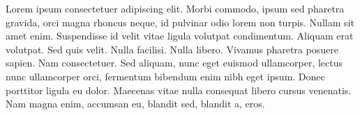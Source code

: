 
Lorem ipsum consectetuer adipiscing elit. Morbi commodo, ipsum sed pharetra gravida, orci magna rhoncus neque, id pulvinar odio lorem non turpis. Nullam sit amet enim. Suspendisse id velit vitae ligula volutpat condimentum. Aliquam erat volutpat. Sed quis velit. Nulla facilisi. Nulla libero. Vivamus pharetra posuere sapien. Nam consectetuer. Sed aliquam, nunc eget euismod ullamcorper, lectus nunc ullamcorper orci, fermentum bibendum enim nibh eget ipsum. Donec porttitor ligula eu dolor. Maecenas vitae nulla consequat libero cursus venenatis. Nam magna enim, accumsan eu, blandit sed, blandit a, eros.
